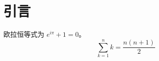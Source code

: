 \documentclass{ctexart}
\begin{document}
\section{引言}
欧拉恒等式为 $e^{i\pi}+1=0$。
\[
  \sum_{k=1}^n k = \frac{n(n+1)}{2}
\]
\end{document}
